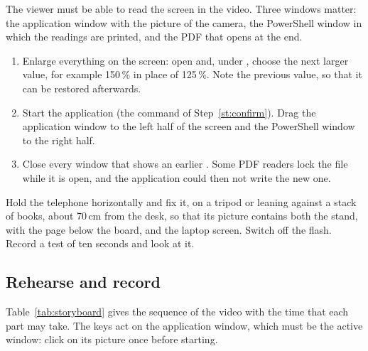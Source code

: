 The viewer must be able to read the screen in the video. Three windows matter: the application
window with the picture of the camera, the PowerShell window in which the readings are printed,
and the PDF that opens at the end.
\begin{enumerate}
\item Enlarge everything on the screen: open \then{}\then{}
  and, under , choose the next larger value, for example 150\,\% in place of
  125\,\%. Note the previous value, so that it can be restored afterwards.
\item Start the application (the command of Step~\ref{st:confirm}). Drag the application window
  to the left half of the screen and the PowerShell window to the right half.
\item Close every window that shows an earlier . Some PDF readers lock the
  file while it is open, and the application could then not write the new one.
\end{enumerate}

Hold the telephone horizontally and fix it, on a tripod or leaning against a stack of books,
about 70\,cm from the desk, so that its picture contains both the stand, with the page below
the board, and the laptop screen. Switch off the flash. Record a test of ten seconds and look
at it.

\subsection{Rehearse and record}

Table~\ref{tab:storyboard} gives the sequence of the video with the time that each part may
take. The keys act on the application window, which must be the active window: click on its
picture once before starting.

